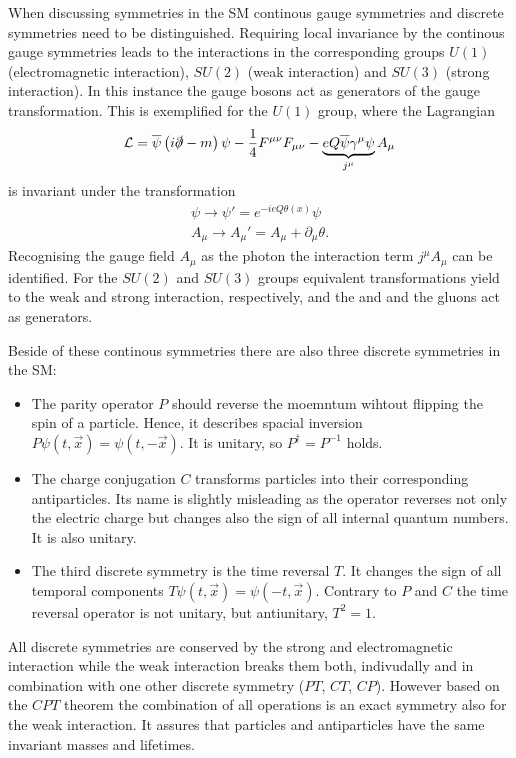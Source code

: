 When discussing symmetries in the \ac{SM} continous gauge symmetries and discrete symmetries need to be distinguished.
Requiring local invariance by the continous gauge symmetries leads to the interactions in the corresponding groups $U(1)$ (electromagnetic interaction), $SU(2)$ (weak interaction) and $SU(3)$ (strong interaction).
In this instance the gauge bosons act as generators of the gauge transformation.
This is exemplified for the $U(1)$ group, where the Lagrangian
\begin{equation}
\mathcal{L}=\overline{\psi}\left(i\slashed{\partial} - m\right)\psi
- \frac{1}{4}F^{\mu\nu}F_{\mu\nu} - \underbrace{eQ\overline{\psi}\gamma^{\mu}\psi}_{j^{\mu}}A_{\mu}
\end{equation}
is invariant under the transformation
\begin{align}
\psi\rightarrow\psi'=e^{-ieQ\theta\left(x\right)}\psi\\
A_\mu\rightarrow A_\mu'=A_\mu+\partial_\mu\theta.
\end{align}
Recognising the gauge field $A_\mu$ as the photon the interaction term $j^\mu A_\mu$ can be identified.
For the $SU(2)$ and $SU(3)$ groups equivalent transformations yield to the weak and strong interaction, respectively, and the \Wpm and \Z and the gluons act as generators.

Beside of these continous symmetries there are also three discrete symmetries in the \ac{SM}:
\begin{itemize}
	\item The parity operator $P$ should reverse the moemntum wihtout flipping the spin of a particle.
		Hence, it describes spacial inversion $P\psi\left(t,\vec{x}\right) = \psi\left(t,-\vec{x}\right)$.
		It is unitary, so $P^{\dagger}=P^{-1}$ holds.
	\item The charge conjugation $C$ transforms particles into their corresponding antiparticles.
		Its name is slightly misleading as the operator reverses not only the electric charge but changes also the sign of all internal quantum numbers.
		It is also unitary.
	\item The third discrete symmetry is the time reversal $T$.
		It changes the sign of all temporal components $T\psi\left(t,\vec{x}\right) = \psi\left(-t,\vec{x}\right)$.
		Contrary to $P$ and $C$ the time reversal operator is not unitary, but antiunitary, \ie $T^2=1$.
\end{itemize}
All discrete symmetries are conserved by the strong and electromagnetic interaction while the weak interaction breaks them both,
indivudally and in combination with one other discrete symmetry ($PT$, $CT$, $CP$).
However based on the $CPT$ theorem the combination of all operations is an exact symmetry also for the weak interaction.
It assures that particles and antiparticles have the same invariant masses and lifetimes.

